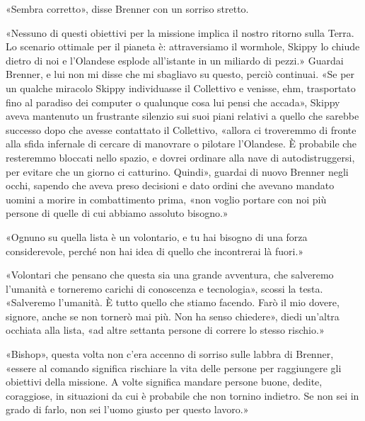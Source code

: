 «Sembra corretto», disse Brenner con un sorriso stretto.

«Nessuno di questi obiettivi per la missione implica il nostro ritorno
sulla Terra. Lo scenario ottimale per il pianeta è: attraversiamo il
wormhole, Skippy lo chiude dietro di noi e l'Olandese esplode
all'istante in un miliardo di pezzi.» Guardai Brenner, e lui non mi
disse che mi sbagliavo su questo, perciò continuai. «Se per un qualche
miracolo Skippy individuasse il Collettivo e venisse, ehm, trasportato
fino al paradiso dei computer o qualunque cosa lui pensi che accada»,
Skippy aveva mantenuto un frustrante silenzio sui suoi piani relativi a
quello che sarebbe successo dopo che avesse contattato il Collettivo,
«allora ci troveremmo di fronte alla sfida infernale di cercare di
manovrare o pilotare l'Olandese. È probabile che resteremmo bloccati
nello spazio, e dovrei ordinare alla nave di autodistruggersi, per
evitare che un giorno ci catturino. Quindi», guardai di nuovo Brenner
negli occhi, sapendo che aveva preso decisioni e dato ordini che avevano
mandato uomini a morire in combattimento prima, «non voglio portare con
noi più persone di quelle di cui abbiamo assoluto bisogno.»

«Ognuno su quella lista è un volontario, e tu hai bisogno di una forza
considerevole, perché non hai idea di quello che incontrerai là fuori.»

«Volontari che pensano che questa sia una grande avventura, che
salveremo l'umanità e torneremo carichi di conoscenza e tecnologia»,
scossi la testa. «Salveremo l'umanità. È tutto quello che stiamo
facendo. Farò il mio dovere, signore, anche se non tornerò mai più. Non
ha senso chiedere», diedi un'altra occhiata alla lista, «ad altre
settanta persone di correre lo stesso rischio.»

«Bishop», questa volta non c'era accenno di sorriso sulle labbra di
Brenner, «essere al comando significa rischiare la vita delle persone
per raggiungere gli obiettivi della missione. A volte significa mandare
persone buone, dedite, coraggiose, in situazioni da cui è probabile che
non tornino indietro. Se non sei in grado di farlo, non sei l'uomo
giusto per questo lavoro.»

